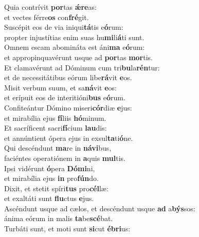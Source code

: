 \evenverse Quia contrívit \textbf{por}tas \textbf{ǽ}\textbf{re}as:~\*\\
\evenverse et vectes férre\textbf{os} con\textbf{fré}git.\\
\oddverse Suscépit eos de via iniqui\textbf{tá}tis e\textbf{ó}rum:~\*\\
\oddverse propter injustítias enim suas hu\textbf{mi}li\textbf{á}ti sunt.\\
\evenverse Omnem escam abomináta est áni\textbf{ma} e\textbf{ó}rum:~\*\\
\evenverse et appropinquavérunt usque ad \textbf{por}tas \textbf{mor}tis.\\
\oddverse Et clamavérunt ad Dóminum cum tri\textbf{bu}la\textbf{rén}tur:~\*\\
\oddverse et de necessitátibus eórum libe\textbf{rá}vit \textbf{e}os.\\
\evenverse Misit verbum suum, et sa\textbf{ná}vit \textbf{e}os:~\*\\
\evenverse et erípuit eos de interitióni\textbf{bus} e\textbf{ó}rum.\\
\oddverse Confiteántur Dómino miseri\textbf{cór}diæ \textbf{e}jus:~\*\\
\oddverse et mirabília ejus \textbf{fí}liis \textbf{hó}minum.\\
\evenverse Et sacríficent sacri\textbf{fí}cium \textbf{lau}dis:~\*\\
\evenverse et annúntient ópera ejus in exsul\textbf{ta}ti\textbf{ó}ne.\\
\oddverse Qui descéndunt \textbf{ma}re in \textbf{ná}\textbf{vi}bus,~\*\\
\oddverse faciéntes operatiónem in \textbf{a}quis \textbf{mul}tis.\\
\evenverse Ipsi vidérunt \textbf{ó}pera \textbf{Dó}\textbf{mi}ni,~\*\\
\evenverse et mirabília ejus \textbf{in} pro\textbf{fún}do.\\
\oddverse Dixit, et stetit spíri\textbf{tus} pro\textbf{cél}læ:~\*\\
\oddverse et exaltáti sunt \textbf{flu}ctus \textbf{e}jus.\\
\evenverse Ascéndunt usque ad cælos, et descéndunt usque \textbf{ad} a\textbf{býs}sos:~\*\\
\evenverse ánima eórum in malis \textbf{ta}be\textbf{scé}bat.\\
\oddverse Turbáti sunt, et moti sunt \textbf{si}cut \textbf{é}\textbf{bri}us:~\*\\
